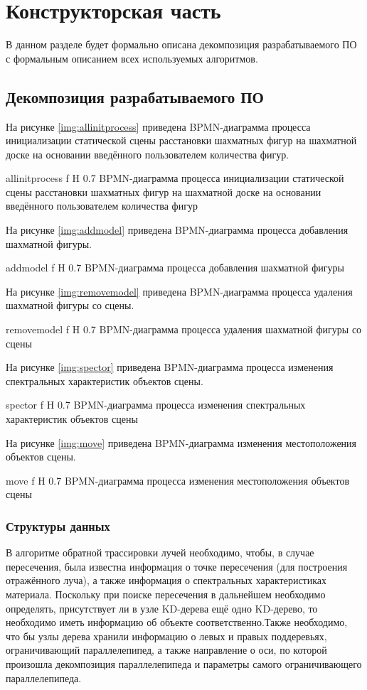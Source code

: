 \chapter{Конструкторская часть}

В данном разделе будет формально описана декомпозиция разрабатываемого ПО с формальным описанием всех используемых алгоритмов.

\section{Декомпозиция разрабатываемого ПО}

На рисунке \ref{img:allinitprocess} приведена BPMN-диаграмма процесса инициализации статической сцены расстановки шахматных фигур на шахматной доске на основании введённого пользователем количества фигур.

{allinitprocess}
{f}
{H}
{0.7\textwidth}
{BPMN-диаграмма процесса инициализации статической сцены расстановки шахматных фигур на шахматной доске на основании введённого пользователем количества фигур}

На рисунке \ref{img:addmodel} приведена BPMN-диаграмма процесса добавления шахматной фигуры.

{addmodel}
{f}
{H}
{0.7\textwidth}
{BPMN-диаграмма процесса добавления шахматной фигуры}

На рисунке \ref{img:removemodel} приведена BPMN-диаграмма процесса удаления шахматной фигуры со сцены.

{removemodel}
{f}
{H}
{0.7\textwidth}
{BPMN-диаграмма процесса удаления шахматной фигуры со сцены}

На рисунке \ref{img:spector} приведена BPMN-диаграмма процесса изменения спектральных характеристик объектов сцены.

{spector}
{f}
{H}
{0.7\textwidth}
{BPMN-диаграмма процесса изменения спектральных характеристик объектов сцены}

На рисунке \ref{img:move} приведена BPMN-диаграмма изменения местоположения объектов сцены.

{move}
{f}
{H}
{0.7\textwidth}
{BPMN-диаграмма процесса изменения местоположения объектов сцены}

\subsection{Структуры данных}

В алгоритме обратной трассировки лучей необходимо, чтобы, в случае пересечения, была известна информация о точке пересечения (для построения отражённого луча), а также информация о спектральных характеристиках материала. 
Поскольку при поиске пересечения в дальнейшем необходимо определять, присутствует ли в узле KD-дерева ещё одно KD-дерево, то необходимо иметь информацию об объекте соответственно.Также необходимо, что бы узлы дерева хранили информацию о левых и правых поддеревьях, ограничивающий параллелепипед, а также направление о оси, по которой произошла декомпозиция параллелепипеда и параметры самого ограничивающего параллелепипеда.

